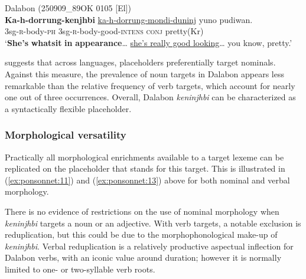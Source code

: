 \documentclass[output=paper]{langscibook}
\begin{document}
\ea
{\label{ex:ponsonnet:13}Dalabon (250909\_89OK 0105 [El])}\\
\gll \textbf{Ka-h-dorrung-kenjhbi} \uline{ka-h-dorrung-mondi-duninj}     yuno    pudiwan.\\
\textup{3sg-}\textsc{r}\textup{{}-body}\textsc{{}-ph} \textup{3sg-}\textsc{r}\textup{{}-body}\textup{{}-good-}\textsc{intens} \textsc{conj} \textup{pretty(Kr)}\\
\glt ‘\textbf{She’s} \textbf{whatsit} \textbf{in} \textbf{appearance}… \uline{she’s really good looking}… you know, pretty.’
\z 

\citet[14]{Podlesskaya2010} suggests that across languages, placeholders preferentially target nominals. Against this measure, the prevalence of noun targets in Dalabon appears less remarkable than the relative frequency of verb targets, which account for nearly one out of three occurrences. Overall, Dalabon \textit{keninjhbi} can be characterized as a syntactically flexible placeholder.  

\subsubsection{Morphological versatility}
\label{sec:ponsonnet:3.2.2}
Practically all morphological enrichments available to a target lexeme can be replicated on the placeholder that stands for this target. This is illustrated in (\ref{ex:ponsonnet:11}) and (\ref{ex:ponsonnet:13}) above for both nominal and verbal morphology. 

There is no evidence of restrictions on the use of nominal morphology when \textit{keninjhbi} targets a noun or an adjective. With verb targets, a notable exclusion is reduplication, but this could be due to the morphophonological make-up of \textit{keninjhbi}. Verbal reduplication is a relatively productive aspectual inflection for Dalabon verbs, with an iconic value around duration; however it is normally limited to one- or two-syllable verb roots. 
\end{document}
